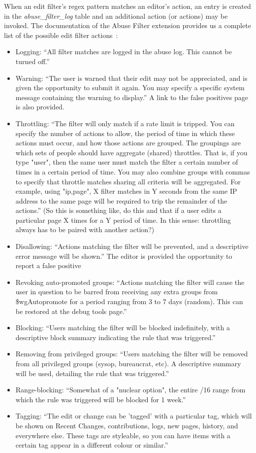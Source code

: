 When an edit filter's regex pattern matches an editor's action, an entry is created in the \emph{abuse\_filter\_log} table and an additional action (or actions) may be invoked.
The documentation of the Abuse Filter extension provides us a complete list of the possible edit filter actions~\cite{Mediawiki:AbuseFilterActions}:
\begin{itemize}
    \item Logging: ``All filter matches are logged in the abuse log. This cannot be turned off.''
    \item Warning: ``The user is warned that their edit may not be appreciated, and is given the opportunity to submit it again. You may specify a specific system message containing the warning to display.'' A link to the false positives page~\cite{Wikipedia:EditFilterFalsePositives} is also provided.
    \item Throttling: ``The filter will only match if a rate limit is tripped. You can specify the number of actions to allow, the period of time in which these actions must occur, and how those actions are grouped.
         The groupings are which sets of people should have aggregate (shared) throttles. That is, if you type "user", then the same user must match the filter a certain number of times in a certain period of time. You may also combine groups with commas to specify that throttle matches sharing all criteria will be aggregated. For example, using "ip,page", X filter matches in Y seconds from the same IP address to the same page will be required to trip the remainder of the actions.''
         (So this is something like, do this and that if a user edits a particular page X times for a Y period of time. In this sense: throttling always has to be paired with another action?)
    \item Disallowing: ``Actions matching the filter will be prevented, and a descriptive error message will be shown.'' The editor is provided the opportunity to report a false positive
    \item Revoking auto-promoted groups: ``Actions matching the filter will cause the user in question to be barred from receiving any extra groups from \$wgAutopromote for a period ranging from 3 to 7 days (random). This can be restored at the debug tools page.''
    \item Blocking: ``Users matching the filter will be blocked indefinitely, with a descriptive block summary indicating the rule that was triggered.''
    \item Removing from privileged groups: ``Users matching the filter will be removed from all privileged groups (sysop, bureaucrat, etc). A descriptive summary will be used, detailing the rule that was triggered.''
    \item Range-blocking: ``Somewhat of a "nuclear option", the entire /16 range from which the rule was triggered will be blocked for 1 week.''
    \item Tagging: ``The edit or change can be 'tagged' with a particular tag, which will be shown on Recent Changes, contributions, logs, new pages, history, and everywhere else. These tags are styleable, so you can have items with a certain tag appear in a different colour or similar.''
\end{itemize}

